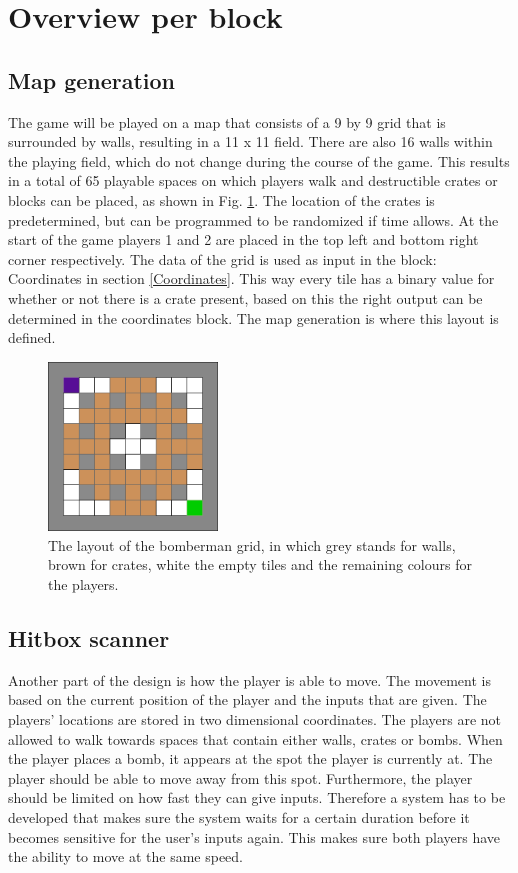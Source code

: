 \section{Overview per block}
\label{overview}

\subsection{Map generation}\label{Map generation}
The game will be played on a map that consists of a 9 by 9 grid that is surrounded by walls, resulting in a 11 x 11 field. There are also 16 walls within the playing field, which do not change during the course of the game. This results in a total of 65 playable spaces on which players walk and destructible crates or blocks can be placed, as shown in Fig. \ref{fig:layout}. The location of the crates is predetermined, but can be programmed to be randomized if time allows. At the start of the game players 1 and 2 are placed in the top left and bottom right corner respectively. The data of the grid is used as input in the block: Coordinates in section \ref{Coordinates}. This way every tile has a binary value for whether or not there is a crate present, based on this the right output can be determined in the coordinates block. The map generation is where this layout is defined.

\begin{figure}[H]
    \centering
    \includegraphics[width=0.4\textwidth]{Figures/bomberman.png}
    \caption{The layout of the bomberman grid, in which grey stands for walls, brown for crates, white the empty tiles and the remaining colours for the players.}
    \label{fig:layout}
\end{figure}


\subsection{Hitbox scanner}\label{Hitbox Scanner}
Another part of the design is how the player is able to move. The movement is based on the current position of the player and the inputs that are given. The players' locations are stored in two dimensional coordinates. The players are not allowed to walk towards spaces that contain either walls, crates or bombs. When the player places a bomb, it appears at the spot the player is currently at. The player should be able to move away from this spot. Furthermore, the player should be limited on how fast they can give inputs. Therefore a system has to be developed that makes sure the system waits for a certain duration before it becomes sensitive for the user's inputs again. This makes sure both players have the ability to move at the same speed. 

